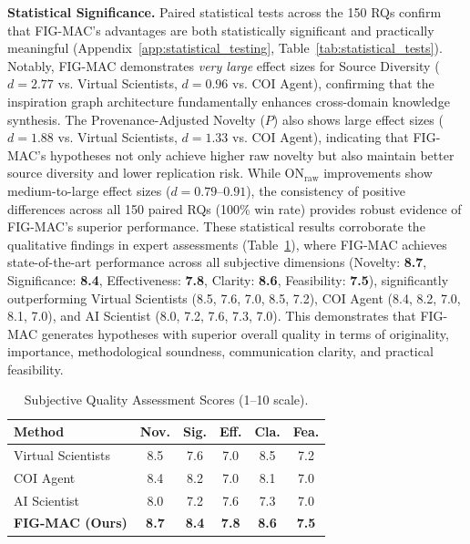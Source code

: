 \documentclass[runningheads]{llncs}
\begin{document}
\textbf{Statistical Significance.} Paired statistical tests across the 150 RQs confirm that FIG-MAC's advantages are both statistically significant and practically meaningful (Appendix~\ref{app:statistical_testing}, Table~\ref{tab:statistical_tests}). Notably, FIG-MAC demonstrates \textit{very large} effect sizes for Source Diversity ($d = 2.77$ vs. Virtual Scientists, $d = 0.96$ vs. COI Agent), confirming that the inspiration graph architecture fundamentally enhances cross-domain knowledge synthesis. The Provenance-Adjusted Novelty ($P$) also shows large effect sizes ($d = 1.88$ vs. Virtual Scientists, $d = 1.33$ vs. COI Agent), indicating that FIG-MAC's hypotheses not only achieve higher raw novelty but also maintain better source diversity and lower replication risk. While ON$_{\text{raw}}$ improvements show medium-to-large effect sizes ($d = 0.79$--$0.91$), the consistency of positive differences across all 150 paired RQs (100\% win rate) provides robust evidence of FIG-MAC's superior performance. These statistical results corroborate the qualitative findings in expert assessments (Table~\ref{tab:subjective_quality}), where FIG-MAC achieves state-of-the-art performance across all subjective dimensions (Novelty: \textbf{8.7}, Significance: \textbf{8.4}, Effectiveness: \textbf{7.8}, Clarity: \textbf{8.6}, Feasibility: \textbf{7.5}), significantly outperforming Virtual Scientists (8.5, 7.6, 7.0, 8.5, 7.2), COI Agent (8.4, 8.2, 7.0, 8.1, 7.0), and AI Scientist (8.0, 7.2, 7.6, 7.3, 7.0). This demonstrates that FIG-MAC generates hypotheses with superior overall quality in terms of originality, importance, methodological soundness, communication clarity, and practical feasibility.

\begin{table}[t]
\centering
\small
\caption{Subjective Quality Assessment Scores (1--10 scale).}
\label{tab:subjective_quality}
\setlength{\tabcolsep}{4pt}
\begin{tabular}{lccccc}
\toprule
\textbf{Method} & \textbf{Nov.} & \textbf{Sig.} & \textbf{Eff.} & \textbf{Cla.} & \textbf{Fea.} \\
\midrule
Virtual Scientists & 8.5 & 7.6 & 7.0 & 8.5 & 7.2 \\
COI Agent & 8.4 & 8.2 & 7.0 & 8.1 & 7.0 \\
AI Scientist & 8.0 & 7.2 & 7.6 & 7.3 & 7.0 \\
\midrule
\textbf{FIG-MAC (Ours)} & \textbf{8.7} & \textbf{8.4} & \textbf{7.8} & \textbf{8.6} & \textbf{7.5} \\
\bottomrule
\end{tabular}
\end{table}
\end{document}
